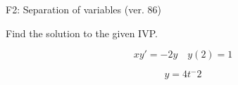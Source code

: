 \begin{exercise}
  \begin{exerciseTitle}F2: Separation of variables (ver. 86)\end{exerciseTitle}
  \begin{exerciseStatement}
    
Find the solution to the given IVP.

    
\[xy'= -2 y \hspace{1em} y( 2 ) = 1\]

  \end{exerciseStatement}
  \begin{exerciseAnswer}
    
\[y= 4 t^ -2\]

  \end{exerciseAnswer}
\end{exercise}